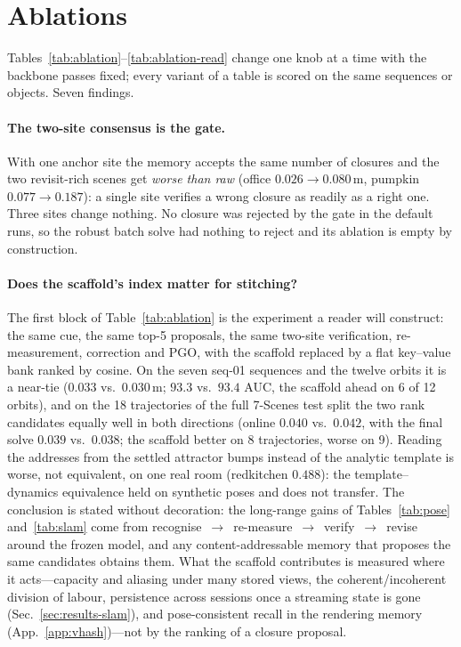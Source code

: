 

\section{Ablations}
\label{app:ablations}



Tables~\ref{tab:ablation}--\ref{tab:ablation-read} change one knob at a time with the backbone passes fixed; every
variant of a table is scored on the same sequences or objects. Seven findings.

\paragraph{The two-site consensus is the gate.}
With one anchor site the memory accepts the same number of closures and the two revisit-rich scenes get \emph{worse
than raw} (office $0.026\!\to\!0.080$\,m, pumpkin $0.077\!\to\!0.187$): a single site verifies a wrong closure as
readily as a right one. Three sites change nothing. No closure was rejected by the gate in the default runs, so the
robust batch solve had nothing to reject and its ablation is empty by construction.

\paragraph{Does the scaffold's index matter for stitching?}
The first block of Table~\ref{tab:ablation} is the experiment a reader will construct: the same cue, the same top-5
proposals, the same two-site verification, re-measurement, correction and PGO, with the scaffold replaced by a flat
key--value bank ranked by cosine. On the seven seq-01 sequences and the twelve orbits it is a near-tie ($0.033$ vs.\
$0.030$\,m; $93.3$ vs.\ $93.4$ AUC, the scaffold ahead on 6 of 12 orbits), and on the 18 trajectories of the full
7-Scenes test split the two rank candidates equally well in both directions (online $0.040$ vs.\ $0.042$, with the
final solve $0.039$ vs.\ $0.038$; the scaffold better on 8 trajectories, worse on 9). Reading the addresses from the
settled attractor bumps instead of the analytic template is worse, not equivalent, on one real room (redkitchen
$0.488$): the template--dynamics equivalence held on synthetic poses and does not transfer. The conclusion is stated
without decoration: the long-range gains of Tables~\ref{tab:pose} and~\ref{tab:slam} come from
recognise~$\to$~re-measure~$\to$~verify~$\to$~revise around the frozen model, and any content-addressable memory
that proposes the same candidates obtains them. What the scaffold contributes is measured where it acts---capacity
and aliasing under many stored views, the coherent/incoherent division of labour, persistence across sessions once a
streaming state is gone (Sec.~\ref{sec:results-slam}), and pose-consistent recall in the rendering memory
(App.~\ref{app:vhash})---not by the ranking of a closure proposal.


